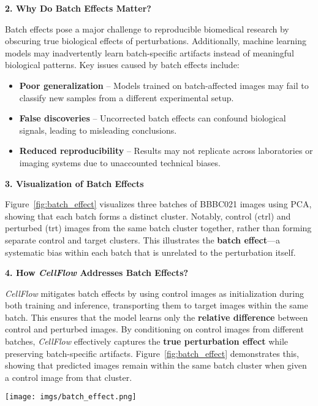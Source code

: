 \textbf{2. Why Do Batch Effects Matter?}  

Batch effects pose a major challenge to reproducible biomedical research by obscuring true biological effects of perturbations. Additionally, machine learning models may inadvertently learn batch-specific artifacts instead of meaningful biological patterns. Key issues caused by batch effects include:

\begin{itemize}[itemsep=0pt, parsep=0pt, topsep=0pt]
    \item \textbf{Poor generalization} – Models trained on batch-affected images may fail to classify new samples from a different experimental setup.
    \item \textbf{False discoveries} – Uncorrected batch effects can confound biological signals, leading to misleading conclusions.
    \item \textbf{Reduced reproducibility} – Results may not replicate across laboratories or imaging systems due to unaccounted technical biases.
\end{itemize}

\textbf{3. Visualization of Batch Effects}  

Figure~\ref{fig:batch_effect} visualizes three batches of BBBC021 images using PCA, showing that each batch forms a distinct cluster. Notably, control (ctrl) and perturbed (trt) images from the same batch cluster together, rather than forming separate control and target clusters. This illustrates the \textbf{batch effect}—a systematic bias within each batch that is unrelated to the perturbation itself.

\textbf{4. How \emph{CellFlow} Addresses Batch Effects?}  

\emph{CellFlow} mitigates batch effects by using control images as initialization during both training and inference, transporting them to target images within the same batch. This ensures that the model learns only the \textbf{relative difference} between control and perturbed images. By conditioning on control images from different batches, \emph{CellFlow} effectively captures the \textbf{true perturbation effect} while preserving batch-specific artifacts. Figure~\ref{fig:batch_effect} demonstrates this, showing that predicted images remain within the same batch cluster when given a control image from that cluster.

\vspace{-1em}
\begin{figure*}[htbp]
    \centering
    \texttt{[image: imgs/batch\_effect.png]}
    \caption{\textbf{Visualization of batch effects in BBBC021 and how \emph{CellFlow} addresses batch effects.}  }
    \vspace{-1em}
    
    \label{fig:batch_effect}
\end{figure*}


